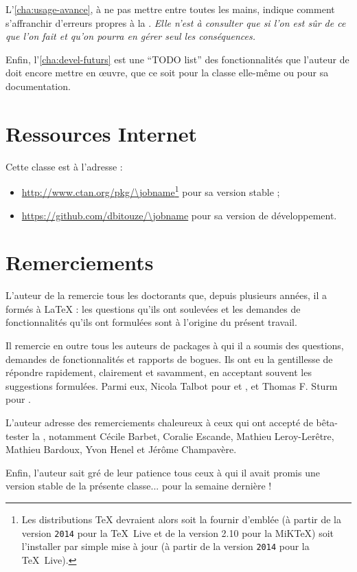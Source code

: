 L'\vref{cha:usage-avance}, à ne pas mettre entre toutes les mains, indique
comment s'affranchir d'erreurs propres à la \yatcl{}. \emph{Elle n'est
  à consulter que si l'on est sûr de ce que l'on fait et qu'on pourra en gérer
  \emph{seul} les conséquences.}

Enfin, l'\vref{cha:devel-futurs} est une \foreignquote{english}{TODO list} des
fonctionnalités que l'auteur de \yat{} doit encore mettre en œuvre, que ce soit
pour la classe elle-même ou pour sa documentation.

\section{Ressources Internet}
\label{sec:ressources-internet}

Cette classe est  à l'adresse :
\begin{itemize}
\item \url{http://www.ctan.org/pkg/\jobname}\footnote{Les distributions \TeX{}
    devraient alors soit la fournir d'emblée (à partir de la version
    \texttt{2014} pour la \TeX~Live et de la version 2.10 pour la MiK\TeX{})
    soit l'installer par simple mise à jour (à partir de la version
    \texttt{2014} pour la \TeX~Live).}  pour sa version stable ;
\item \url{https://github.com/dbitouze/\jobname} pour sa version de
  développement.
\end{itemize}

\section{Remerciements}
\label{sec:remerciements}

L'auteur de la \yatcl{} remercie tous les doctorants que, depuis plusieurs
années, il a formés à \LaTeX{} : les questions qu'ils ont soulevées et les
demandes de fonctionnalités qu'ils ont formulées sont à l'origine du présent
travail.

Il remercie en outre tous les auteurs de packages à qui il a soumis  des questions, demandes de fonctionnalités et
rapports de bogues. Ils ont eu la gentillesse de répondre rapidement,
clairement et savamment, en acceptant souvent les suggestions formulées. Parmi
eux, Nicola Talbot pour  et , et Thomas
F. Sturm pour .

L'auteur adresse des remerciements chaleureux à ceux qui ont accepté de
bêta-tester la \yatcl{}, notamment Cécile Barbet, Coralie Escande, Mathieu
Leroy-Lerêtre, Mathieu Bardoux, Yvon Henel et Jérôme Champavère.

Enfin, l'auteur sait gré de leur patience tous ceux à qui il avait promis une
version stable de la présente classe... pour la semaine dernière !

%
\iffalse
\fi

